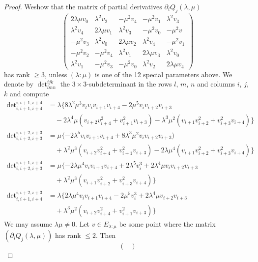 \begin{proof}
We\pageoriginale show that the matrix of partial derivatives
$\partial_{i}Q_{j}(\lambda,\mu)$
$$
\begin{pmatrix}
2\lambda \mu v_{0} & \lambda^{2}v_{2} & -\mu^{2}v_{4} & -\mu^{2}v_{1}
& \lambda^{2}v_{3}\\
\lambda^{2}v_{4} & 2\lambda \mu v_{1} & \lambda^{2}v_{3} &
-\mu^{2}v_{0} & -\mu^{2}v\\
-\mu^{2}v_{3} & \lambda^{2}v_{0} & 2\lambda\mu v_{2}
& \lambda^{2}v_{4} & -\mu^{2}v_{1}\\
-\mu^{2}v_{2} & -\mu^{2}v_{4} & \lambda^{2}v_{1} & 2\lambda \mu v_{3}
& \lambda^{2}v_{0}\\
\lambda^{2}v_{1} & -\mu^{2}v_{3} & -\mu^{2}v_{0} & \lambda^{2}v_{2} &
2\lambda \mu v_{4}
\end{pmatrix}
$$
has rank $\geq 3$, unless $(\lambda:\mu)$ is one of the 12 special
parameters above. We denote by $\det^{ijk}_{lmn}$ the $3\times
3$-subdeterminant in the rows $l$, $m$, $n$ and columns $i$, $j$, $k$
and compute
\begin{align*}
\det\nolimits^{i,i+1,i+4}_{i,i+1,i+4}
&= \lambda \{8\lambda^{2}\mu^{3}v_{t}v_{i}v_{i+1}v_{i+4}-2\mu^{5}v_{i}v_{i+2}v_{i+3}\\
&\quad -2\lambda^{4}\mu(v_{i+2}v^{2}_{i+4}+v^{2}_{i+1}v_{i+3})
 -\lambda^{3}\mu^{2}(v_{i+1}v^{2}_{i+2}+v^{2}_{i+3}v_{i+4})\}\\
\det\nolimits^{i,i+2,i+3}_{i,i+2,i+3}&= \mu\{-2\lambda^{5}v_{i}v_{i+1}v_{i+4}+8\lambda^{3}\mu^{2}v_{i}v_{i+2}v_{i+3})\\
&\quad +\lambda^{2}\mu^{3}(v_{i+2}v^{2}_{i+4}+v^{2}_{i+1}v_{i+3})
 -2\lambda \mu^{4}(v_{i+1}v^{2}_{i+2}+v^{2}_{i+3}v_{i+4})\}\\
\det\nolimits^{i,i+1,i+4}_{i,i+2,i+3}
&=\mu \{-2\lambda \mu^{4}v_{i}v_{i+1}v_{i+4}+2\lambda^{5}v^{3}_{i}+2\lambda^{4}\mu
v_{i}v_{i+2}v_{i+3}\\
&\quad +\lambda^{2}\mu^{3}(v_{i+1}v^{2}_{i+2}+v^{2}_{i+3}v_{i+4})\}\\
\det\nolimits^{i,i+2,i+3}_{i,i+1,i+4}
&= \lambda \{2\lambda \mu^{4}v_{i}v_{i+1}v_{i+4}-2\mu^{5}v^{3}_{i}+2\lambda^{4}\mu
v_{i+2}v_{i+3}\\
&\quad +\lambda^{3}\mu^{2}(v_{i+2}v^{2}_{i+4}+v^{2}_{i+1}v_{i+3})\}
\end{align*}\pageoriginale
We may assume $\lambda \mu \neq 0$. Let $v\in E_{\lambda:\mu}$ be some
point where the matrix $(\partial_{i}Q_{j}(\lambda,\mu))$ has rank
$\leq 2$. Then
$$
\begin{pmatrix}

\end{pmatrix}$$
\end{proof}
